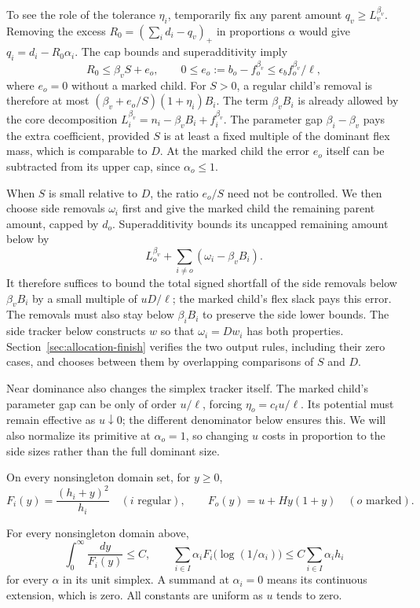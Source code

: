 To see the role of the tolerance $\eta_i$, temporarily fix any parent
amount $q_v\ge L_v^{\beta_v}$.  Removing the excess
$R_0=(\sum_i d_i-q_v)_+$ in proportions $\alpha$ would give
$q_i=d_i-R_0\alpha_i$.  The cap bounds and superadditivity imply
\[
 R_0\le\beta_v S+e_o,\qquad
 0\le e_o:=b_o-f_o^{\beta_v}\le\epsilon_b f_o^{\beta_v}/\ell,
\]
where $e_o=0$ without a marked child.  For $S>0$, a regular child's
removal is therefore at most
$(\beta_v+e_o/S)(1+\eta_i)B_i$.  The term $\beta_v B_i$ is
already allowed by the core decomposition
$L_i^{\beta_v}=n_i-\beta_v B_i+f_i^{\beta_v}$.
The parameter gap $\beta_i-\beta_v$ pays the extra coefficient,
provided $S$ is at least a fixed multiple of the dominant flex mass,
which is comparable to $D$.  At the marked child the error $e_o$
itself can be subtracted from its upper cap, since $\alpha_o\le1$.

When $S$ is small relative to $D$, the ratio $e_o/S$ need not be
controlled.  We then choose side removals $\omega_i$ first and give
the marked child the remaining parent amount, capped by $d_o$.
Superadditivity bounds its uncapped remaining amount below by
\[
             L_o^{\beta_v}
                  +\sum_{i\ne o}(\omega_i-\beta_v B_i).
\]
It therefore suffices to bound the total signed shortfall of the side
removals below $\beta_v B_i$ by a small multiple of $uD/\ell$; the
marked child's flex slack pays this error.  The removals must also stay below
$\beta_iB_i$ to preserve the side lower bounds.  The side tracker
below constructs $w$ so that $\omega_i=Dw_i$ has both properties.
Section~\ref{sec:allocation-finish} verifies the two output rules,
including their zero cases, and chooses between them by overlapping
comparisons of $S$ and $D$.

Near dominance also changes the simplex tracker itself.  The marked
child's parameter gap can be only of order $u/\ell$, forcing
$\eta_o=c_tu/\ell$.  Its potential must remain effective as
$u\downarrow0$; the different denominator below ensures this.
We will also normalize its primitive at $\alpha_o=1$, so changing
$u$ costs in proportion to the side sizes rather than the full
dominant size.

On every nonsingleton domain set, for $y\ge0$,
\begin{equation}\label{eq:proportion-denominators}
  F_i(y)=\frac{(h_i+y)^2}{h_i}\quad(i\text{ regular}),
  \qquad F_o(y)=u+Hy(1+y)\quad(o\text{ marked}).
\end{equation}

\begin{lemma}\label{lem:denominators}
For every nonsingleton domain above,
\begin{equation}\label{eq:denominator-estimates}
  \int_0^\infty\frac{dy}{F_i(y)}\le C,
  \qquad
  \sum_{i\in I}\alpha_i F_i\bigl(\log(1/\alpha_i)\bigr)
       \le C\sum_{i\in I}\alpha_i h_i
\end{equation}
for every $\alpha$ in its unit simplex.  A summand at $\alpha_i=0$
means its continuous extension, which is zero.  All constants are
uniform as $u$ tends to zero.
\end{lemma}

